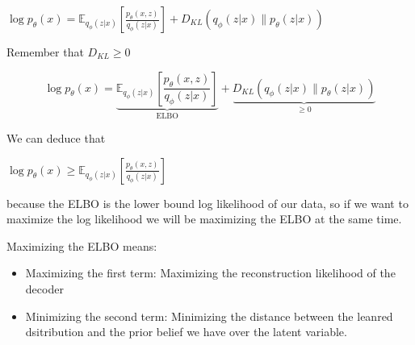 \documentclass{amsart}
\begin{document}
$\log p_{\theta}(x) = \mathbb{E}_{q_{\phi}(z|x)}\left[\frac{p_{\theta}(x,z)}{q_{\phi}(z|x)}\right] + D_{KL}\left(q_{\phi}(z|x) \parallel p_{\theta}(z|x)\right) $ \vspace{0.2 cm}

Remember that $D_{KL} \geq 0$  \vspace{0.2 cm}

\[\log p_{\theta}(x) = \underbrace{\mathbb{E}_{q_{\phi}(z|x)}\left[\frac{p_{\theta}(x,z)}{q_{\phi}(z|x)}\right]}_{\text{ELBO}} + \underbrace{D_{KL}\left(q_{\phi}(z|x) \parallel p_{\theta}(z|x)\right)}_{\text{$\geq 0$}}\]


We can deduce that \vspace{0.2 cm}

$\log p_{\theta}(x) \geq \mathbb{E}_{q_{\phi}(z|x)}\left[\frac{p_{\theta}(x,z)}{q_{\phi}(z|x)}\right]$ \vspace{0.2 cm}

because the ELBO is the lower bound log likelihood of our data, so if we want to maximize the log likelihood we will be maximizing the ELBO at the same time. \vspace{0.2 cm}


Maximizing the ELBO means:

\begin{itemize}
    \item Maximizing the first term: Maximizing the reconstruction likelihood of the decoder
    \item Minimizing the second term: Minimizing the distance between the leanred dsitribution and the prior belief we have over the latent variable. 
\end{itemize}

\end{document}
